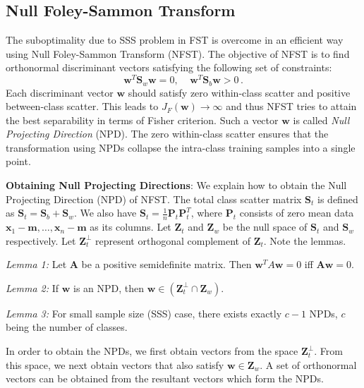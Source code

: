 \documentclass[runningheads]{llncs}
\begin{document}
\subsection{Null Foley-Sammon Transform}
\label{ssec:NFST}
The suboptimality due to SSS problem in FST is overcome in an efficient way using Null Foley-Sammon Transform (NFST). The objective of NFST is to find orthonormal discriminant vectors satisfying the following set of constraints: 
\begin{equation}
\label{eqn:NFSTC1}
\mathbf{w}^T \mathbf{S}_w \mathbf{w} = 0, \;\;\;\;
\mathbf{w}^T \mathbf{S}_b \mathbf{w} > 0 \,.
\end{equation}
Each discriminant vector $\mathbf{w}$ should satisfy zero within-class scatter and positive between-class scatter. This leads to $J_F(\mathbf{w}) \to \infty$ and thus NFST tries to attain the best separability in terms of Fisher criterion. Such a vector $\mathbf{w}$ is called \textit{Null Projecting Direction} (NPD). 
The zero within-class scatter ensures that the transformation using NPDs collapse the intra-class training samples into a single point.

\setlength{\parskip}{1.5mm}
\noindent \textbf{Obtaining Null Projecting Directions}: We explain how to obtain the Null Projecting Direction (NPD) of NFST. The total class scatter matrix $\mathbf{S}_t$ is defined as $\mathbf{S}_t = \mathbf{S}_b + \mathbf{S}_w $. We also have $\mathbf{S}_t = \frac{1}{n}\mathbf{P}_t \mathbf{P}_t^T$, where $\mathbf{P}_t$ consists of zero mean data $\mathbf{x}_{1}-\mathbf{m},\ldots, \mathbf{x}_{n}-\mathbf{m}$ as its columns.
Let $\mathbf{Z}_t$ and $\mathbf{Z}_w$ be the null space of $\mathbf{S}_t$ and $\mathbf{S}_w$ respectively. Let $\mathbf{Z}^\perp_t$ represent orthogonal complement of $\mathbf{Z}_t$. Note the lemmas\cite{guo:nfst}.
\setlength{\parskip}{0mm}

\textit{Lemma 1:} Let $\mathbf{A}$ be a positive semidefinite matrix. Then $\mathbf{w}^TA\mathbf{w}=0$ iff $\mathbf{A}\mathbf{w}=0$. 

\textit{Lemma 2:} If $\mathbf{w}$ is an NPD, then $\mathbf{w} \in (\mathbf{Z}_t^\perp \cap \mathbf{Z}_w)$.

\textit{Lemma 3:} For small sample size (SSS) case, there exists exactly $c-1$ NPDs, $c$ being the number of classes.

In order to obtain the NPDs, we first obtain vectors from the space $\mathbf{Z}_t^\perp$. From this space, we next obtain vectors that also satisfy $\mathbf{w} \in \mathbf{Z}_w$. A set of orthonormal vectors can be obtained from the resultant vectors which form the NPDs. 
\end{document}
